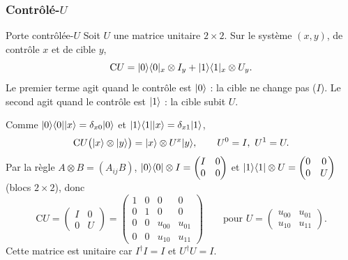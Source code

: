 \subsubsection{Contrôlé-\texorpdfstring{$U$}{U}}

\begin{definition}{Porte contrôlée-$U$}
Soit $U$ une matrice unitaire $2\times2$. Sur le système $(x,y)$, de contrôle $x$ et de cible $y$,
\[
  \mathrm{C}U=|0\rangle\langle 0|_x\otimes I_y+|1\rangle\langle 1|_x\otimes U_y .
\]
Le premier terme agit quand le contrôle est $|0\rangle$ : la cible ne change pas ($I$). Le second
agit quand le contrôle est $|1\rangle$ : la cible subit $U$.
\end{definition}

Comme $|0\rangle\langle 0||x\rangle=\delta_{x0}|0\rangle$ et $|1\rangle\langle 1||x\rangle=\delta_{x1}|1\rangle$,
\[
  \mathrm{C}U\big(|x\rangle\otimes|y\rangle\big)=|x\rangle\otimes U^x|y\rangle,\qquad U^0=I,\ U^1=U .
\]
Par la règle $A\otimes B=(A_{ij}B)$, $|0\rangle\langle 0|\otimes I=\begin{pmatrix}I&0\\0&0\end{pmatrix}$
et $|1\rangle\langle 1|\otimes U=\begin{pmatrix}0&0\\0&U\end{pmatrix}$ (blocs $2\times2$), donc
\[
  \mathrm{C}U=\begin{pmatrix}I&0\\0&U\end{pmatrix}
  =\begin{pmatrix}1&0&0&0\\0&1&0&0\\0&0&u_{00}&u_{01}\\0&0&u_{10}&u_{11}\end{pmatrix}
  \qquad\text{pour }U=\begin{pmatrix}u_{00}&u_{01}\\u_{10}&u_{11}\end{pmatrix}.
\]
Cette matrice est unitaire car $I^\dagger I=I$ et $U^\dagger U=I$.


